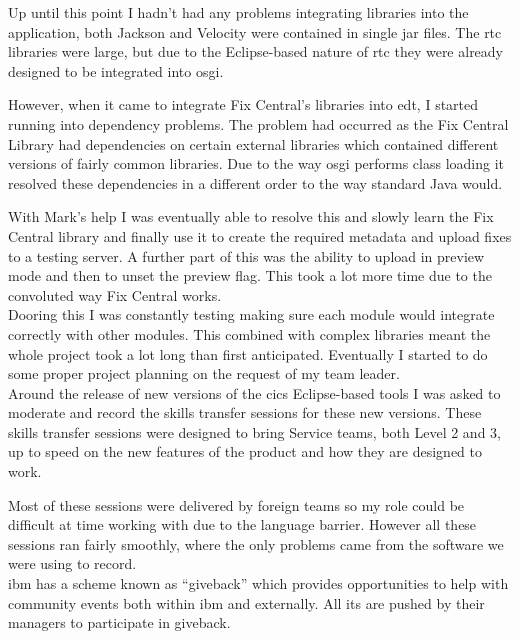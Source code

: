 \documentclass[a4paper,11pt]{report}
\begin{document}
Up until this point I hadn't had any problems integrating libraries into the application, both
Jackson and Velocity were contained in single jar files. The \gls{rtc} libraries were large, but
due to the Eclipse-based nature of \gls{rtc} they were already designed to be integrated into 
\gls{osgi}.

However, when it came to integrate Fix Central's libraries into \gls{edt}, I started running into
dependency problems. The problem had occurred as the Fix Central Library had dependencies on
certain external libraries which contained different versions of fairly common libraries. Due to
the way \gls{osgi} performs class loading it resolved these dependencies in a different order to
the way standard Java would.

With Mark's help I was eventually able to resolve this and slowly learn the Fix Central library and
finally use it to create the required metadata and upload fixes to a testing server. A further part
of this was the ability to upload in preview mode and then to unset the preview flag. This took a
lot more time due to the convoluted way Fix Central works. \\

Dooring this I was constantly testing making sure each module would integrate correctly with other
modules. This combined with complex libraries meant the whole project took a lot long than first
anticipated. Eventually I started to do some proper project planning on the request of my team 
leader. \\



Around the release of new versions of the \gls{cics} Eclipse-based tools I was asked to moderate
and record the skills transfer sessions for these new versions. These skills transfer sessions were
designed to bring Service teams, both Level 2 and 3, up to speed on the new features of the product
and how they are designed to work.

Most of these sessions were delivered by foreign teams so my role could be difficult at time
working with due to the language barrier. However all these sessions ran fairly smoothly, where
the only problems came from the software we were using to record. \\



\gls{ibm} has a scheme known as ``giveback'' which provides opportunities to help with community
events both within \gls{ibm} and externally. All \gls{it}s are pushed by their managers to 
participate in giveback.
\end{document}
